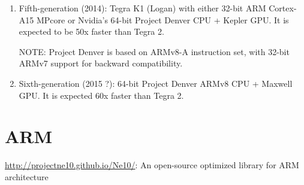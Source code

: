 \begin{enumerate}
  \item Fifth-generation (2014): Tegra K1 (Logan) with either 32-bit ARM
  Cortex-A15 MPcore or Nvidia's 64-bit Project Denver CPU + Kepler GPU. It is
  expected to be 50x faster than Tegra 2.
  
  NOTE: Project Denver is based on ARMv8-A instruction set, with 32-bit ARMv7
  support for backward compatibility.
  
  \item Sixth-generation (2015 ?): 64-bit Project Denver ARMv8 CPU + Maxwell
  GPU. It is expected 60x faster than Tegra 2.
\end{enumerate}


% 


\section{ARM}

\url{http://projectne10.github.io/Ne10/}: An open-source optimized library for
ARM architecture


